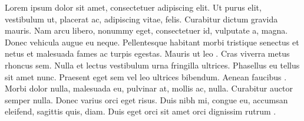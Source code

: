\documentclass[a4paper,12pt]{article}
\begin{document}
Lorem ipsum dolor sit amet, consectetuer adipiscing elit. Ut purus elit, vestibulum ut, placerat ac,  adipiscing vitae, felis. Curabitur dictum gravida mauris. Nam arcu libero, nonummy eget, consectetuer id, vulputate a, magna. Donec vehicula augue eu neque. Pellentesque habitant morbi tristique senectus et netus et malesuada fames ac turpis egestas. Mauris ut leo \cite{DE} . Cras viverra metus rhoncus sem. Nulla et lectus vestibulum urna fringilla ultrices.  Phasellus eu tellus sit amet  nunc. Praesent eget sem vel leo ultrices bibendum. Aenean faucibus \cite{SS}. Morbi dolor nulla, malesuada eu, pulvinar at, mollis ac, nulla. Curabitur auctor semper nulla. Donec varius orci eget risus. Duis nibh mi, congue eu, accumsan eleifend, sagittis quis, diam. Duis eget orci sit amet orci dignissim rutrum .




\nocite{texbook}
\nocite{latexbook}
\end{document}
